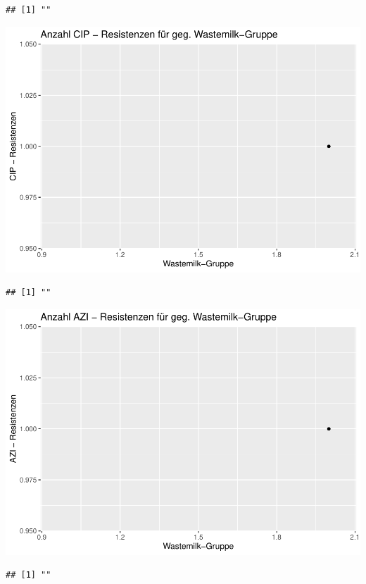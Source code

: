 \documentclass[
]{article}
\begin{document}
\begin{verbatim}
## [1] ""
\end{verbatim}

\includegraphics{NResistenzen_files/figure-latex/unnamed-chunk-7-2.pdf}

\begin{verbatim}
## [1] ""
\end{verbatim}

\includegraphics{NResistenzen_files/figure-latex/unnamed-chunk-7-3.pdf}

\begin{verbatim}
## [1] ""
\end{verbatim}
\end{document}
